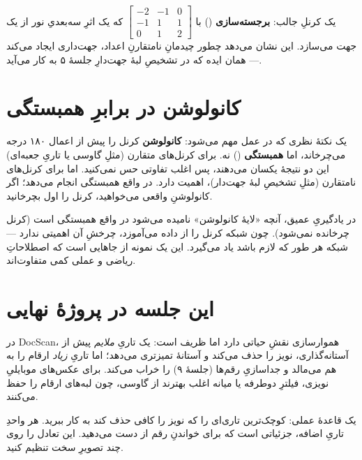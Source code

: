 \documentclass[12pt,a4paper]{article}
\begin{document}
\begin{yaddasht}
یک کرنلِ جالب: \textbf{برجسته‌سازی} () با $\begin{bmatrix}-2&-1&0\\-1&1&1\\0&1&2\end{bmatrix}$
که یک اثرِ سه‌بعدیِ نور از یک جهت می‌سازد. این نشان می‌دهد چطور چیدمانِ نامتقارنِ اعداد، جهت‌داری
ایجاد می‌کند — همان ایده که در تشخیصِ لبهٔ جهت‌دارِ جلسهٔ ۵ به کار می‌آید.
\end{yaddasht}

\section{کانولوشن در برابرِ همبستگی}

یک نکتهٔ نظری که در عمل مهم می‌شود: \textbf{کانولوشن} کرنل را پیش از اعمال ۱۸۰ درجه می‌چرخاند،
اما \textbf{همبستگی} () نه. برای کرنل‌های متقارن (مثلِ گاوسی یا تاریِ جعبه‌ای)
این دو نتیجهٔ یکسان می‌دهند، پس اغلب تفاوتی حس نمی‌کنید. اما برای کرنل‌های نامتقارن (مثلِ تشخیصِ
لبهٔ جهت‌دار)، اهمیت دارد.  در واقع همبستگی انجام می‌دهد؛ اگر کانولوشنِ واقعی
می‌خواهید، کرنل را اول بچرخانید.

\begin{nokte}
در یادگیریِ عمیق، آنچه «لایهٔ کانولوشن» نامیده می‌شود در واقع همبستگی است (کرنل چرخانده نمی‌شود).
چون شبکه کرنل را از داده می‌آموزد، چرخشِ آن اهمیتی ندارد — شبکه هر طور که لازم باشد یاد می‌گیرد.
این یک نمونه از جاهایی است که اصطلاحاتِ ریاضی و عملی کمی متفاوت‌اند.
\end{nokte}

\section{این جلسه در پروژهٔ نهایی}

در DocScan، هموارسازی نقشِ حیاتی دارد اما ظریف است: یک تاریِ \emph{ملایم} پیش از آستانه‌گذاری،
نویز را حذف می‌کند و آستانهٔ تمیزتری می‌دهد؛ اما تاریِ \emph{زیاد} ارقام را به هم می‌مالد و
جداسازیِ رقم‌ها (جلسهٔ ۹) را خراب می‌کند. برای عکس‌های موبایلیِ نویزی، فیلترِ دوطرفه یا میانه
اغلب بهترند از گاوسی، چون لبه‌های ارقام را حفظ می‌کنند.

\begin{yaddasht}
یک قاعدهٔ عملی: کوچک‌ترین تاری‌ای را که نویز را کافی حذف کند به کار ببرید. هر واحدِ تاریِ اضافه،
جزئیاتی است که برای خواندنِ رقم از دست می‌دهید. این تعادل را روی چند تصویرِ سخت تنظیم کنید.
\end{yaddasht}
\end{document}

